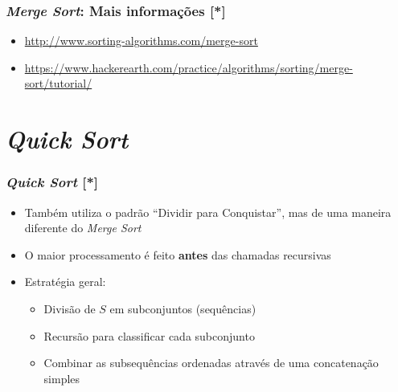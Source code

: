 \documentclass[aspectratio=169]{beamer}
\begin{document}
\begin{frame}[fragile]\frametitle{\emph{Merge Sort}: Mais informações [*]}
\begin{itemize}
	\item \url{http://www.sorting-algorithms.com/merge-sort}
	\item \url{https://www.hackerearth.com/practice/algorithms/sorting/merge-sort/tutorial/}
\end{itemize}
\end{frame}

\section{\emph{Quick Sort}}

\begin{frame}\frametitle{\emph{Quick Sort} [*]}
\begin{itemize}	
	\item Também utiliza o padrão ``Dividir para Conquistar'', mas de uma maneira diferente do \emph{Merge Sort}
	\item O maior processamento é feito \textbf{antes} das chamadas recursivas
	\item Estratégia geral:
	\begin{itemize}	
		\item Divisão de $S$ em subconjuntos (sequências)
		\item Recursão para classificar cada subconjunto
		\item Combinar as subsequências ordenadas através de uma concatenação simples
	\end{itemize}
\end{itemize}
\end{frame}
\end{document}
